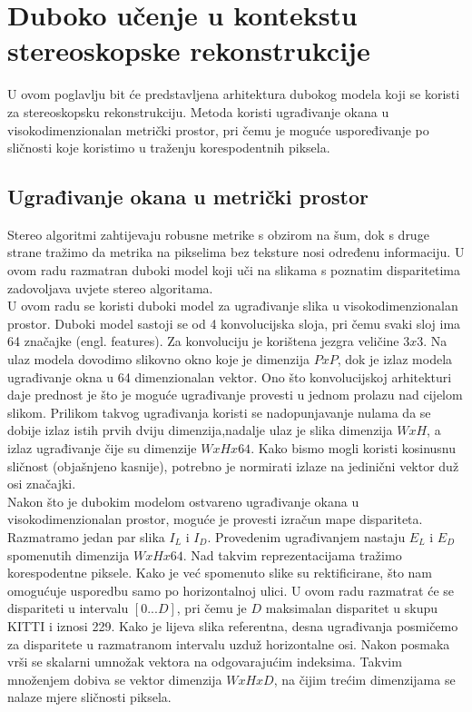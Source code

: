 \documentclass[times, utf8, zavrsni, numeric]{fer}
\begin{document}
\chapter{Duboko učenje u kontekstu stereoskopske rekonstrukcije}
U ovom poglavlju bit će predstavljena arhitektura dubokog modela koji se koristi za stereoskopsku rekonstrukciju. Metoda koristi ugrađivanje okana u visokodimenzionalan metrički prostor, pri čemu je moguće uspoređivanje po sličnosti koje koristimo u traženju korespodentnih piksela.
\section{Ugrađivanje okana u metrički prostor}
Stereo algoritmi zahtijevaju robusne metrike s obzirom na šum, dok s druge strane tražimo da metrika na pikselima bez teksture nosi određenu informaciju. U ovom radu razmatran duboki model koji uči na slikama s poznatim disparitetima zadovoljava uvjete stereo algoritama.\\
U ovom radu se koristi duboki model za ugrađivanje slika u visokodimenzionalan prostor.\citep{zbontar2} Duboki model sastoji se od 4 konvolucijska sloja, pri čemu svaki sloj ima 64 značajke (engl. features). Za konvoluciju je korištena jezgra veličine $3 x 3$. Na ulaz modela dovodimo slikovno okno koje je dimenzija $P x P$, dok je izlaz modela ugrađivanje okna u 64 dimenzionalan vektor. Ono što konvolucijskoj arhitekturi daje prednost je što je moguće ugrađivanje provesti u jednom prolazu nad cijelom slikom. Prilikom takvog ugrađivanja koristi se nadopunjavanje nulama da se dobije izlaz istih prvih dviju dimenzija,nadalje ulaz je slika dimenzija $W x H$, a izlaz ugrađivanje čije su dimenzije $W x H x 64$. Kako bismo mogli koristi kosinusnu sličnost (objašnjeno kasnije), potrebno je normirati izlaze na jedinični vektor duž osi značajki.\pagebreak
\\
Nakon što je dubokim modelom ostvareno ugrađivanje okana u visokodimenzionalan prostor, moguće je provesti izračun mape dispariteta. Razmatramo jedan par slika $I_{L}$ i $I_{D}$. Provedenim ugrađivanjem nastaju $E_{L}$ i $E_{D}$ spomenutih dimenzija $W x H x 64$. Nad takvim reprezentacijama tražimo korespodentne piksele. Kako je već spomenuto slike su rektificirane, što nam omogućuje usporedbu samo po horizontalnoj ulici. U ovom radu razmatrat će se dispariteti u intervalu $[0...D]$, pri čemu je $D$ maksimalan disparitet u skupu KITTI i iznosi 229. Kako je lijeva slika referentna, desna ugrađivanja posmičemo za disparitete u razmatranom intervalu uzduž horizontalne osi. Nakon posmaka vrši se skalarni umnožak vektora na odgovarajućim indeksima. Takvim množenjem dobiva se vektor dimenzija $W x H x D$, na čijim trećim dimenzijama se nalaze mjere sličnosti piksela.\\
\end{document}
